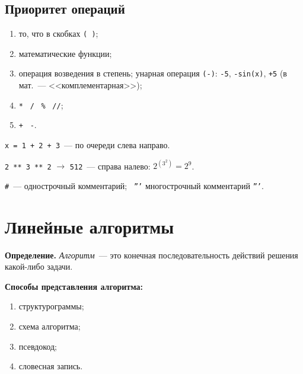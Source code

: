\documentclass[a4paper,11pt]{article}
\newcommand{\lead}[1]{\textbf{\color{leadcol}#1}\ }
\begin{document}
\subsection{Приоритет операций}
\begin{enumerate}[label=\arabic*)]
\item то, что в скобках \texttt{( )};
\item математические функции;
\item[3--4)] операция возведения в степень; унарная операция \texttt{(-)}: \texttt{-5},
\texttt{-sin(x)}, \texttt{+5} (в мат.~--- <<комплементарная>>);
\item[5)] \texttt{*} \ \texttt{/} \ \texttt{\%} \ \texttt{//};
\item[6)] \texttt{+} \ \texttt{-}.
\end{enumerate}

\texttt{x = 1 + 2 + 3}~--- по очереди слева направо.

\texttt{2 ** 3 ** 2} $\to$ \texttt{512}~--- справа налево: $2^{(3^2)}=2^9$.

\texttt{\#}~--- однострочный комментарий; \ \texttt{'''} многострочный комментарий \texttt{'''}.

\section{Линейные алгоритмы}
\begin{opr}
\textbf{Определение.} \emph{Алгоритм}~--- это конечная последовательность действий решения
какой-либо задачи.
\end{opr}

\lead{Способы представления алгоритма:}
\begin{enumerate}[label=\arabic*.]
\item структурограммы;
\item схема алгоритма;
\item псевдокод;
\item словесная запись.
\end{enumerate}
\end{document}
